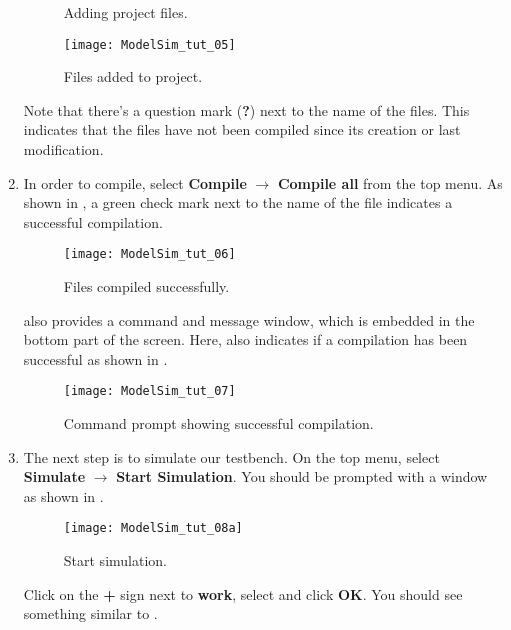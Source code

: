 \documentclass[number=01]{assignment}
\newcommand{\SVtbdividefile}{\colorfilename{tb\_divide\_clk\_by\_2.sv}}
\begin{document}
\begin{enumerate}
\begin{figure}[!ht]
    \caption{Adding project files.}
    \label{Figure:Add_files_OK}
    \end{figure}
    \begin{figure}[!ht]
    \centering
    \texttt{[image: ModelSim\_tut\_05]}
    \caption{Files added to project.}
    \label{Figure:Files_added}
    \end{figure}
    \newline
    Note that there's a question mark (\textbf{?}) next to the name of the files. This indicates that the files have not been compiled since its creation or last modification.
    \newpage
\item In order to compile, select \textbf{Compile} $\rightarrow$ \textbf{Compile all} from the top menu.
As shown in , a green check mark next to the name of the file indicates a successful compilation. 
%
%
\begin{figure}[!htb]
\centering
\texttt{[image: ModelSim\_tut\_06]}
\caption{Files compiled successfully.}
\label{Figure:Files_compiled1}
\end{figure}
%
%
\newline
\ModelSim also provides a command and message window, which is embedded in the bottom part of the screen. 
Here, \ModelSim also indicates if a compilation has been successful as shown in .
%
%
\begin{figure}[!htb]
\centering
\texttt{[image: ModelSim\_tut\_07]}
\caption{Command prompt showing successful compilation.}
\label{Figure:Files_compiled2}
\end{figure}
%
%
\item \label{item:sim_step} The next step is to simulate our testbench.
On the top menu, select \textbf{Simulate} $\rightarrow$ \textbf{Start Simulation}. 
You should be prompted with a window as shown in . 
%
%
\begin{figure}[!htb]
\centering
\texttt{[image: ModelSim\_tut\_08a]}
\caption{Start simulation.}
\label{Figure:Start_sim1}
\end{figure}
%
%
\newline
Click on the \textbf{+} sign next to \textbf{work}, select \SVtbdividefile and click \textbf{OK}. You should see something similar to .
%
%
\begin{figure}[!htb]

\end{figure}
\end{enumerate}
\end{document}

